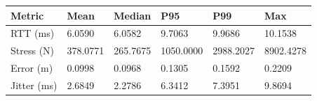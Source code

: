 \begin{tabular}{llllll}
\toprule
Metric & Mean & Median & P95 & P99 & Max \\
\midrule
RTT (ms) & 6.0590 & 6.0582 & 9.7063 & 9.9686 & 10.1538 \\
Stress (N) & 378.0771 & 265.7675 & 1050.0000 & 2988.2027 & 8902.4278 \\
Error (m) & 0.0998 & 0.0968 & 0.1305 & 0.1592 & 0.2209 \\
Jitter (ms) & 2.6849 & 2.2786 & 6.3412 & 7.3951 & 9.8694 \\
\bottomrule
\end{tabular}
